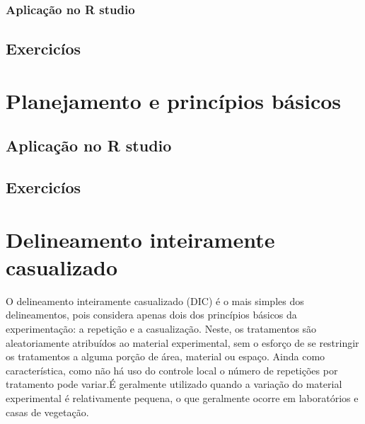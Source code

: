 \documentclass[
]{book}
\newenvironment{Shaded}{\begin{snugshade}}{\end{snugshade}}
\newcommand{\AttributeTok}[1]{\textcolor[rgb]{0.77,0.63,0.00}{#1}}
\newcommand{\ConstantTok}[1]{\textcolor[rgb]{0.00,0.00,0.00}{#1}}
\newcommand{\FunctionTok}[1]{\textcolor[rgb]{0.00,0.00,0.00}{#1}}
\newcommand{\NormalTok}[1]{#1}
\newcommand{\SpecialCharTok}[1]{\textcolor[rgb]{0.00,0.00,0.00}{#1}}
\newcommand{\StringTok}[1]{\textcolor[rgb]{0.31,0.60,0.02}{#1}}
\begin{document}
\hypertarget{aplicauxe7uxe3o-no-r-studio}{%
\subsection{Aplicação no R studio}\label{aplicauxe7uxe3o-no-r-studio}}

\hypertarget{exercicuxedos}{%
\section{Exercicíos}\label{exercicuxedos}}

\hypertarget{planejamento}{%
\chapter{Planejamento e princípios básicos}\label{planejamento}}

\hypertarget{aplicauxe7uxe3o-no-r-studio-1}{%
\section{Aplicação no R studio}\label{aplicauxe7uxe3o-no-r-studio-1}}

\hypertarget{exercicuxedos-1}{%
\section{Exercicíos}\label{exercicuxedos-1}}

\begin{Shaded}
\end{Shaded}

\hypertarget{delineamento-inteiramente-casualizado}{%
\chapter{Delineamento inteiramente casualizado}\label{delineamento-inteiramente-casualizado}}

O delineamento inteiramente casualizado (DIC) é o mais simples dos delineamentos, pois considera apenas dois dos princípios básicos da experimentação: a repetição e a casualização. Neste, os tratamentos são aleatoriamente atribuídos ao material experimental, sem o esforço de se restringir os tratamentos a alguma porção de área, material ou espaço. Ainda como característica, como não há uso do controle local o número de repetições por tratamento pode variar.É geralmente utilizado quando a variação do material experimental é relativamente pequena, o que geralmente ocorre em laboratórios e casas de vegetação.
\end{document}
